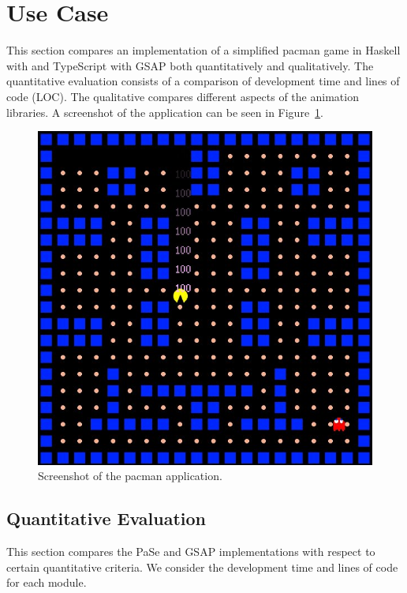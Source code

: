 \section{Use Case}

This section compares an implementation of a simplified pacman game in Haskell with \dsl{} and TypeScript with GSAP both quantitatively and qualitatively. The quantitative evaluation consists of a comparison of development time and lines of code (LOC). The qualitative compares different aspects of the animation libraries. A screenshot of the application can be seen in Figure~\ref{fig:pacman}.

\begin{figure}[h]{\textwidth}
\centering
\includegraphics[width=.3\textwidth]{pictures/pacman}
\caption{Screenshot of the pacman application.}
\label{fig:pacman}
\end{figure}

\subsection{Quantitative Evaluation}

This section compares the PaSe and GSAP implementations with respect to certain quantitative criteria. We consider the development time and lines of code for each module.

